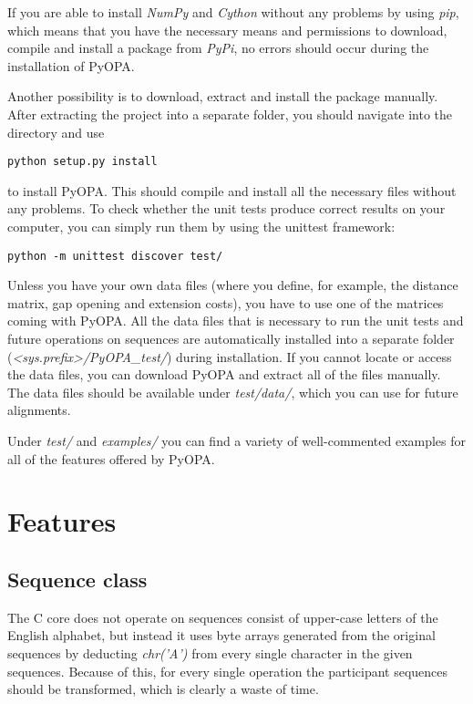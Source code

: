 \documentclass[12pt]{article}
\newcommand{\pp}{PyOPA}
\begin{document}
If you are able to install \emph{NumPy} and \emph{Cython} without any problems by using \emph{pip}, which means that you have the necessary means and permissions to download, compile and install a package from \emph{PyPi}, no errors should occur during the installation of \pp{}.

Another possibility is to download, extract and install the package manually. After extracting the project into a separate folder, you should navigate into the directory and use

\begin{lstlisting}
python setup.py install
\end{lstlisting}

to install \pp{}. This should compile and install all the necessary files without any problems. To check whether the unit tests produce correct results on your computer, you can simply run them by using the unittest framework:
\begin{lstlisting}
python -m unittest discover test/
\end{lstlisting}

Unless you have your own data files (where you define, for example, the distance matrix, gap opening and extension costs), you have to use one of the matrices coming with \pp{}. All the data files that is necessary to run the unit tests and future operations on sequences are automatically installed into a separate folder (\emph{\textless{}sys.prefix\textgreater/\pp{}\_test/}) during installation. If you cannot locate or access the data files, you can download \pp{} and extract all of the files manually. The data files should be available under \emph{test/data/}, which you can use for future alignments. 

Under \emph{test/} and \emph{examples/} you can find a variety of well-commented examples for all of the features offered by \pp{}.

\section{Features}
\label{sec:features}

\subsection{Sequence class}
\label{subsec:normseq}
The C core does not operate on sequences consist of upper-case letters of the English alphabet, but instead it uses byte arrays generated from the original sequences by deducting \emph{chr('A')} from every single character in the given sequences. Because of this, for every single operation the participant sequences should be transformed, which is clearly a waste of time.
\end{document}
